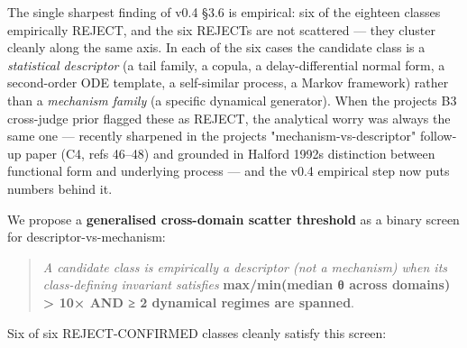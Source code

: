 \documentclass[
  11pt]{article}
\begin{document}
The single sharpest finding of v0.4 §3.6 is empirical: six of the
eighteen classes empirically REJECT, and the six REJECTs are not
scattered --- they cluster cleanly along the same axis. In each of the
six cases the candidate class is a \emph{statistical descriptor}
(a tail family, a copula, a delay-differential normal form, a
second-order ODE template, a self-similar process, a Markov framework)
rather than a \emph{mechanism family} (a specific dynamical generator).
When the project\textquotesingle s B3 cross-judge prior flagged these as
REJECT, the analytical worry was always the same one --- recently
sharpened in the project\textquotesingle s "mechanism-vs-descriptor"
follow-up paper (C4, refs 46--48) and grounded in Halford 1992\textquotesingle s
distinction between functional form and underlying process --- and the
v0.4 empirical step now puts numbers behind it.

We propose a \textbf{generalised cross-domain scatter threshold} as a
binary screen for descriptor-vs-mechanism:

\begin{quote}
\emph{A candidate class is empirically a descriptor (not a mechanism)
when its class-defining invariant satisfies} \textbf{max/min(median θ
across domains) > 10× AND ≥ 2 dynamical regimes are spanned}.
\end{quote}

Six of six REJECT-CONFIRMED classes cleanly satisfy this screen:
\end{document}

